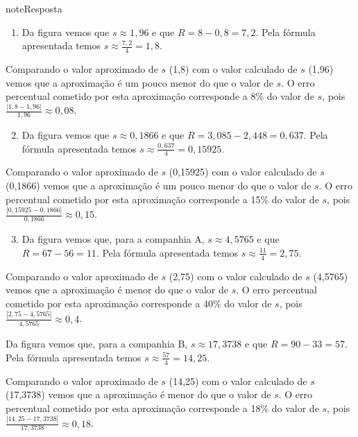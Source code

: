 \begin{sphinxadmonition}{note}{Resposta}
\begin{enumerate}
\item {} 
Da figura {\hyperref[\detokenize{PE104-5:fig-resumonartes}]{}} vemos que \(s\approx 1,96\) e que \(R=8-0,8=7,2\). Pela fórmula apresentada temos \({s}\approx\frac{7,2}{4}=1,8\).

\end{enumerate}

Comparando o valor aproximado de \(s\) (1,8) com o valor calculado de \(s\) (1,96) vemos que a aproximação é um pouco menor do que o valor de \(s\). O erro percentual cometido por esta aproximação corresponde a 8\% do valor de \(s\), pois \(\frac{|1,8-1,96|}{1,96}\approx 0,08\).
\begin{enumerate}
\setcounter{enumi}{1}
\item {} 
Da figura {\hyperref[\detokenize{PE104-5:fig-summarymaratonamulheres}]{}} vemos que \(s\approx 0,1866\) e que \(R=3,085-2,448=0,637\). Pela fórmula apresentada temos \({s}\approx\frac{0,637}{4}=0,15925\).

\end{enumerate}

Comparando o valor aproximado de \(s\) (0,15925) com o valor calculado de \(s\) (0,1866) vemos que a aproximação é um pouco menor do que o valor de \(s\). O erro percentual cometido por esta aproximação corresponde a 15\% do valor de \(s\), pois \(\frac{|0,15925-0,1866|}{0,1866}\approx 0,15\).
\begin{enumerate}
\setcounter{enumi}{2}
\item {} 
Da figura {\hyperref[\detokenize{PE104-5:fig-estrategia}]{}} vemos que, para a companhia A,  \(s\approx 4,5765\) e que \(R=67-56=11\). Pela fórmula apresentada temos \({s}\approx\frac{11}{4}=2,75\).

\end{enumerate}

Comparando o valor aproximado de \(s\) (2,75) com o valor calculado de \(s\) (4,5765) vemos que a aproximação é menor do que o valor de \(s\). O erro percentual cometido por esta aproximação corresponde a 40\% do valor de \(s\), pois \(\frac{|2,75-4,5765|}{4,5765}\approx 0,4\).

Da figura {\hyperref[\detokenize{PE104-5:fig-estrategia}]{}} vemos que, para a companhia B,  \(s\approx 17,3738\) e que \(R=90-33=57\). Pela fórmula apresentada temos \({s}\approx\frac{57}{4}=14,25\).

Comparando o valor aproximado de \(s\) (14,25) com o valor calculado de \(s\) (17,3738) vemos que a aproximação é menor do que o valor de \(s\). O erro percentual cometido por esta aproximação corresponde a 18\% do valor de \(s\), pois \(\frac{|14,25-17,3738|}{17,3738}\approx 0,18\).
\end{sphinxadmonition}
